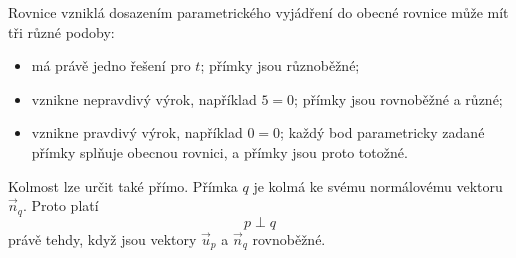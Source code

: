 \begin{remark}\label{rem:Mixed_parametric_general_equation_meaning}
    Rovnice vzniklá dosazením parametrického vyjádření do obecné
    rovnice může mít tři různé podoby:

    \begin{itemize}
        \item má právě jedno řešení pro $t$; přímky jsou různoběžné;
        \item vznikne nepravdivý výrok, například $5=0$; přímky jsou
        rovnoběžné a různé;
        \item vznikne pravdivý výrok, například $0=0$; každý bod
        parametricky zadané přímky splňuje obecnou rovnici, a přímky
        jsou proto totožné.
    \end{itemize}
\end{remark}

Kolmost lze určit také přímo. Přímka $q$ je kolmá ke svému normálovému
vektoru $\vec{n}_q$. Proto platí
\[
    p\perp q
\]
právě tehdy, když jsou vektory $\vec{u}_p$ a $\vec{n}_q$ rovnoběžné.

